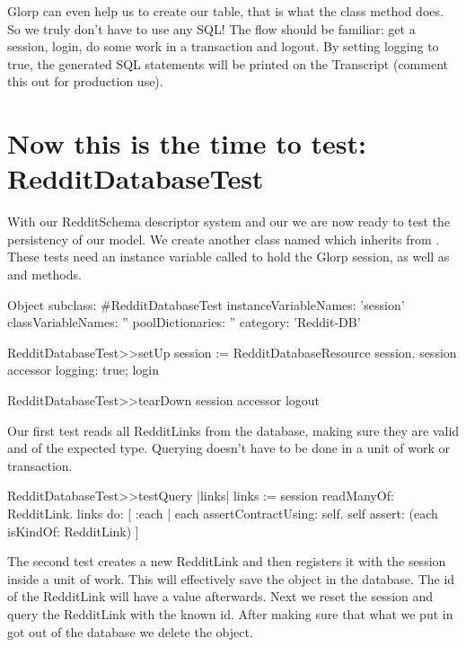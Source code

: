 \documentclass[a4paper,10pt,twoside]{book}
\begin{document}
Glorp can even help us to create our  table, that is what the  class method does. So we truly don't have to use any SQL! The flow should be familiar: get a session, login, do some work in a transaction and logout. By setting logging to true, the generated SQL statements will be printed on the Transcript (comment this out for production use).


\section{Now this is the time to test: RedditDatabaseTest}

With our RedditSchema descriptor system and our  we are now ready to test the persistency of our model. We create another class named  which inherits from . These tests need an instance variable called  to hold the Glorp session, as well as  and  methods.


\begin{code}{}
Object subclass: #RedditDatabaseTest
   instanceVariableNames: 'session' 
   classVariableNames: '' 
   poolDictionaries: '' 
   category: 'Reddit-DB'
\end{code}

\begin{code}{}
RedditDatabaseTest>>setUp
     session := RedditDatabaseResource session.
     session accessor logging: true; login
\end{code}

\begin{code}{}
RedditDatabaseTest>>tearDown
     session accessor logout
\end{code}


Our first test reads all RedditLinks from the database, making sure they are valid and of the expected type. Querying doesn't have to be done in a unit of work or transaction.

\begin{code}{}
RedditDatabaseTest>>testQuery
    |links|
    links := session readManyOf: RedditLink.
     links do: [ :each |
                 each assertContractUsing: self. 
                 self assert: (each isKindOf: RedditLink) ]
\end{code}


The second test creates a new RedditLink and then registers it with the session inside a unit of work. This will effectively save the object in the database. The id of the RedditLink will have a value afterwards. Next we reset the session and query the RedditLink with the known id. After making sure that what we put in got out of the database we delete the object.
\end{document}
